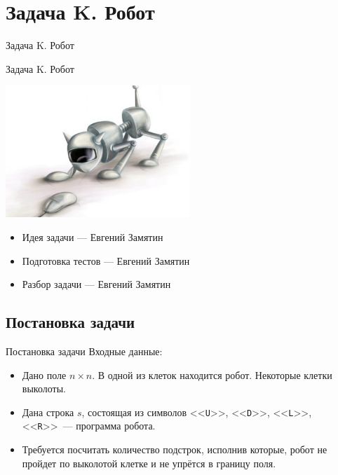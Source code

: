 \section{Задача K. Робот}

\begin{frame}[t]{Задача K. Робот}

  \begin{center}
    \LARGE Задача K. Робот
  \end{center}
  \begin{center}
	  \includegraphics[width=7cm]{pics/robot.jpg}
  \end{center}
\end{frame}

\begin{frame}[t]{}
  \vspace{3cm}
  \begin{itemize}
    \item Идея задачи --- Евгений Замятин
    \item Подготовка тестов --- Евгений Замятин
    \item Разбор задачи --- Евгений Замятин
  \end{itemize}
\end{frame}

\subsection{Постановка задачи}

\begin{frame}[t]{Постановка задачи}
Входные данные:
\begin{itemize}
    \item Дано поле $n \times n$. В одной из клеток находится робот. Некоторые клетки выколоты.
    \item Дана строка $s$, состоящая из символов <<\texttt{U}>>, <<\texttt{D}>>, 
    <<\texttt{L}>>, <<\texttt{R}>>~--- программа робота.
    \item Требуется посчитать количество подстрок, 
    исполнив которые, робот не пройдет по выколотой клетке и не упрётся в границу поля.
\end{itemize}
\end{frame}

